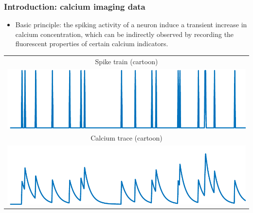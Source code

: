 \documentclass[16pt,presentation]{beamer}
\begin{document}
\begin{frame}
\frametitle{Introduction: calcium imaging data}
\begin{itemize}
\item Basic principle: the \alert{spiking} activity of a neuron induce a transient increase in \alert{calcium concentration}, which can be indirectly observed by recording the \alert{fluorescent properties} of certain calcium indicators.
\end{itemize}
\begin{center}
{\scriptsize
\begin{tabular}[t]{c}
  Spike train (cartoon) \\
\includegraphics[scale=0.4,clip = true]{figs/ROI_cartoon/fig_cartoon_spike_1.pdf}\\
Calcium trace (cartoon) \\
\includegraphics[scale=0.4,clip = true]{figs/ROI_cartoon/fig_cartoon_calcium_1.pdf}
\end{tabular}
}
\end{center}
\end{frame}
\end{document}
